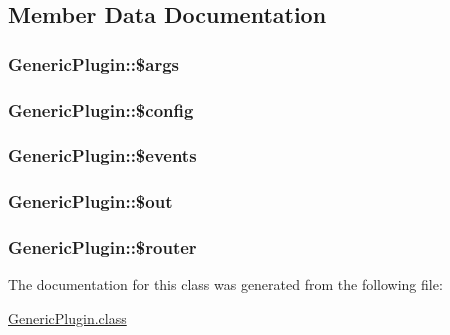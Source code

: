 \subsection{Member Data Documentation}
\hypertarget{classGenericPlugin_a5be5cc3c07081e76380e83ccc8608a9f}{
\subsubsection[{\$args}]{\setlength{\rightskip}{0pt plus 5cm}Generic\-Plugin\-::\$args\hspace{0.3cm}{\ttfamily [private]}}}\label{classGenericPlugin_a5be5cc3c07081e76380e83ccc8608a9f}
\hypertarget{classGenericPlugin_a7e04bf74b03ed3104d44f48e305aae20}{
\subsubsection[{\$config}]{\setlength{\rightskip}{0pt plus 5cm}Generic\-Plugin\-::\$config\hspace{0.3cm}{\ttfamily [private]}}}\label{classGenericPlugin_a7e04bf74b03ed3104d44f48e305aae20}
\hypertarget{classGenericPlugin_aa218905508cd65a11d32be4ea48784e2}{
\subsubsection[{\$events}]{\setlength{\rightskip}{0pt plus 5cm}Generic\-Plugin\-::\$events\hspace{0.3cm}{\ttfamily [private]}}}\label{classGenericPlugin_aa218905508cd65a11d32be4ea48784e2}
\hypertarget{classGenericPlugin_a30615d6f8ff3ececd2897870029277a6}{
\subsubsection[{\$out}]{\setlength{\rightskip}{0pt plus 5cm}Generic\-Plugin\-::\$out\hspace{0.3cm}{\ttfamily [private]}}}\label{classGenericPlugin_a30615d6f8ff3ececd2897870029277a6}
\hypertarget{classGenericPlugin_afcb0f45ee30c880e097cea95e2bc8e7f}{
\subsubsection[{\$router}]{\setlength{\rightskip}{0pt plus 5cm}Generic\-Plugin\-::\$router\hspace{0.3cm}{\ttfamily [private]}}}\label{classGenericPlugin_afcb0f45ee30c880e097cea95e2bc8e7f}


The documentation for this class was generated from the following file\-:\begin{DoxyCompactItemize}
\item 
\hyperlink{GenericPlugin_8class}{Generic\-Plugin.\-class}\end{DoxyCompactItemize}

